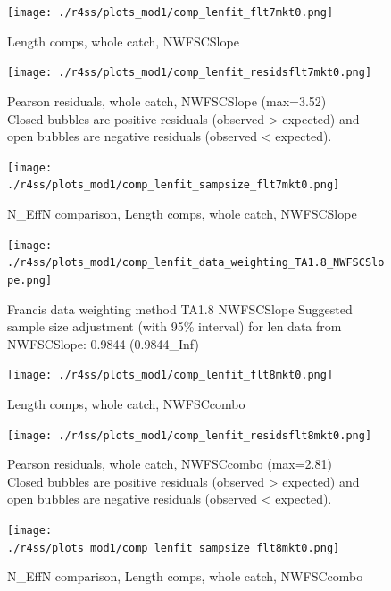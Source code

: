 \documentclass[12pt,]{article}
\begin{document}
\begin{figure}
\centering
\texttt{[image: ./r4ss/plots\_mod1/comp\_lenfit\_flt7mkt0.png]}
\caption{Length comps, whole catch, NWFSCSlope
\label{fig:mod1_26_comp_lenfit_flt7mkt0}}
\end{figure}

\begin{figure}
\centering
\texttt{[image: ./r4ss/plots\_mod1/comp\_lenfit\_residsflt7mkt0.png]}
\caption{Pearson residuals, whole catch, NWFSCSlope (max=3.52)\\
Closed bubbles are positive residuals (observed \textgreater{} expected)
and open bubbles are negative residuals (observed \textless{} expected).
\label{fig:mod1_27_comp_lenfit_residsflt7mkt0}}
\end{figure}

\begin{figure}
\centering
\texttt{[image: ./r4ss/plots\_mod1/comp\_lenfit\_sampsize\_flt7mkt0.png]}
\caption{N\_EffN comparison, Length comps, whole catch, NWFSCSlope
\label{fig:mod1_28_comp_lenfit_sampsize_flt7mkt0}}
\end{figure}

\begin{figure}
\centering
\texttt{[image: ./r4ss/plots\_mod1/comp\_lenfit\_data\_weighting\_TA1.8\_NWFSCSlope.png]}
\caption{Francis data weighting method TA1.8 NWFSCSlope Suggested sample
size adjustment (with 95\% interval) for len data from NWFSCSlope:
0.9844 (0.9844\_Inf)
\label{fig:mod1_29_comp_lenfit_data_weighting_TA1.8_NWFSCSlope}}
\end{figure}

\begin{figure}
\centering
\texttt{[image: ./r4ss/plots\_mod1/comp\_lenfit\_flt8mkt0.png]}
\caption{Length comps, whole catch, NWFSCcombo
\label{fig:mod1_30_comp_lenfit_flt8mkt0}}
\end{figure}

\begin{figure}
\centering
\texttt{[image: ./r4ss/plots\_mod1/comp\_lenfit\_residsflt8mkt0.png]}
\caption{Pearson residuals, whole catch, NWFSCcombo (max=2.81)\\
Closed bubbles are positive residuals (observed \textgreater{} expected)
and open bubbles are negative residuals (observed \textless{} expected).
\label{fig:mod1_31_comp_lenfit_residsflt8mkt0}}
\end{figure}

\begin{figure}
\centering
\texttt{[image: ./r4ss/plots\_mod1/comp\_lenfit\_sampsize\_flt8mkt0.png]}
\caption{N\_EffN comparison, Length comps, whole catch, NWFSCcombo
\label{fig:mod1_32_comp_lenfit_sampsize_flt8mkt0}}
\end{figure}
\end{document}
